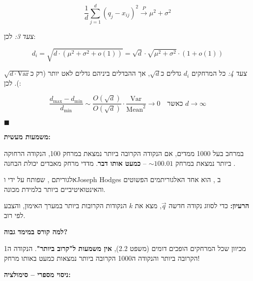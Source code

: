 \[
\frac{\num{1}}{d}\sum_{j=1}^{d} (q_j - x_{ij})^2 \xrightarrow{P} \mu^2 + \sigma^2
\]

\textit{צעד 3:} לכן:

\[
d_i = \sqrt{d \cdot (\mu^2 + \sigma^2 + o(\num{1}))} = \sqrt{d} \cdot \sqrt{\mu^2 + \sigma^2} \cdot (1 + o(\num{1}))
\]

\textit{צעד 4:} כל המרחקים $d_i$ גדלים כ\en{-}$\sqrt{d}$, אך ההבדלים ביניהם גדלים לאט יותר (רק כ\en{-}$\sqrt{d \cdot \text{Var}}$). לכן:

\[
\frac{d_{\max} - d_{\min}}{d_{\min}} \sim \frac{O(\sqrt{d})}{ O(\sqrt{d})} \cdot \frac{\text{Var}}{\text{Mean}^2} \to \num{0} \quad \text{כאשר } d \to \infty
\]

$\blacksquare$

\textbf{משמעות מעשית:}

במרחב בעל \num{1000} ממדים, אם הנקודה הקרובה ביותר נמצאת במרחק \num{100}, הנקודה הרחוקה ביותר נמצאת במרחק $\sim \num{100.01}$ – \textbf{כמעט אותו דבר}. מדדי מרחק מאבדים יכולת הבחנה \cite{beyer1999, aggarwal2001}.


אלגוריתם , שפותח על ידי  ו\en{-}Joseph Hodges ב\en{-} \cite{fix1951}, הוא אחד האלגוריתמים הפשוטים והאינטואיטיביים ביותר בלמידת מכונה.

\textbf{הרעיון:} כדי לסווג נקודה חדשה $\vec{q}$, מצא את $k$ הנקודות הקרובות ביותר במערך האימון, והצבע לפי רוב.

\textbf{למה  קורס במימד גבוה?}

מכיוון שכל המרחקים הופכים דומים (משפט \num{2.2}), \textbf{אין משמעות ל"קרוב ביותר"}. הנקודה ה\en{-}\num{1} הקרובה ביותר והנקודה ה\en{-}\num{1000} הקרובה ביותר נמצאות כמעט באותו מרחק!

\textbf{ניסוי מספרי – סימולציה:}

